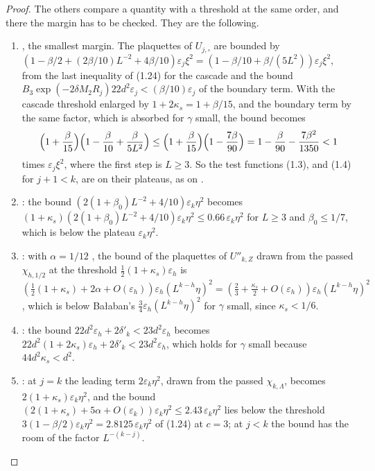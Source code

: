 \documentclass[11pt]{preprint}
\numberwithin{equation}{section}
\theoremstyle{definition}
\theoremstyle{remark}
\theoremstyle{plain}
\begin{document}
\begin{proof}
The others compare a quantity with a threshold at the same order, and there the margin has to be checked. They are the following.
\begin{enumerate}[label=(\roman*)]
\item \cite[(1.31), p.~184]{BalabanLFR1}, the smallest margin. The plaquettes of $U_{j,\square}$ are bounded by $(1 - \beta/2 + (2\beta/10)L^{-2} + 4\beta/10)\varepsilon_j\xi^2 = (1 - \beta/10 + \beta/(5L^2))\varepsilon_j\xi^2$, from the last inequality of (1.24) for the cascade and the bound $B_3\exp(-2\delta M_2R_j)22d^2\varepsilon_j < (\beta/10)\varepsilon_j$ of the boundary term. With the cascade threshold enlarged by $1 + 2\kappa_s = 1 + \beta/15$, and the boundary term by the same factor, which is absorbed for $\gamma$ small, the bound becomes
\begin{equation}\label{eq:smallest-margin}
    \Bigl(1 + \frac{\beta}{15}\Bigr)\Bigl(1 - \frac{\beta}{10} + \frac{\beta}{5L^2}\Bigr) \leq \Bigl(1 + \frac{\beta}{15}\Bigr)\Bigl(1 - \frac{7\beta}{90}\Bigr) = 1 - \frac{\beta}{90} - \frac{7\beta^2}{1350} < 1
\end{equation}
times $\varepsilon_j\xi^2$, where the first step is $L \geq 3$. So the test functions (1.3), and (1.4) for $j + 1 < k$, are on their plateaus, as on \cite[p.~184]{BalabanLFR1}.
\item \cite[(3.8), p.~266]{BalabanCRE}: the bound $(2(1 + \beta_0)L^{-2} + 4/10)\varepsilon_k\eta^2$ becomes $(1 + \kappa_s)(2(1 + \beta_0)L^{-2} + 4/10)\varepsilon_k\eta^2 \leq 0.66\,\varepsilon_k\eta^2$ for $L \geq 3$ and $\beta_0 \leq 1/7$, which is below the plateau $\varepsilon_k\eta^2$.
\item \cite[(1.96), p.~199]{BalabanLFR1}: with $\alpha = 1/12$ \cite[p.~199]{BalabanLFR1}, the bound of the plaquettes of $U''_{k,Z}$ drawn from the passed $\chi_{h,1/2}$ at the threshold $\frac12(1 + \kappa_s)\varepsilon_h$ is $(\frac12(1 + \kappa_s) + 2\alpha + O(\varepsilon_h))\varepsilon_h(L^{k-h}\eta)^2 = (\frac23 + \frac{\kappa_s}{2} + O(\varepsilon_h))\varepsilon_h(L^{k-h}\eta)^2$, which is below Ba{\l}aban's $\frac34\varepsilon_h(L^{k-h}\eta)^2$ for $\gamma$ small, since $\kappa_s < 1/6$.
\item \cite[p.~199]{BalabanLFR1}: the bound $22d^2\varepsilon_h + 2\delta'_k < 23d^2\varepsilon_h$ becomes $22d^2(1 + 2\kappa_s)\varepsilon_h + 2\delta'_k < 23d^2\varepsilon_h$, which holds for $\gamma$ small because $44d^2\kappa_s < d^2$.
\item \cite[(1.98), p.~200]{BalabanLFR1}: at $j = k$ the leading term $2\varepsilon_k\eta^2$, drawn from the passed $\chi_{k,\Lambda}$, becomes $2(1 + \kappa_s)\varepsilon_k\eta^2$, and the bound $(2(1 + \kappa_s) + 5\alpha + O(\varepsilon_k))\varepsilon_k\eta^2 \leq 2.43\,\varepsilon_k\eta^2$ lies below the threshold $3(1 - \beta/2)\varepsilon_k\eta^2 = 2.8125\,\varepsilon_k\eta^2$ of (1.24) at $c = 3$; at $j < k$ the bound has the room of the factor $L^{-(k-j)}$.

\end{enumerate}
\end{proof}
\end{document}
